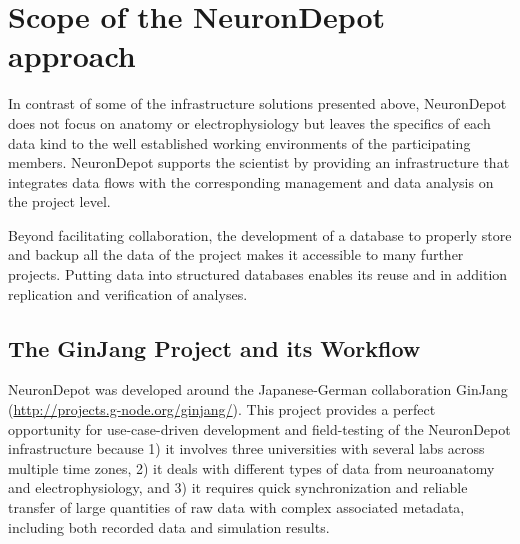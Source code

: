 \documentclass{frontiersSCNS} %
\begin{document}
\section{Scope of the NeuronDepot approach}

In contrast of some of the infrastructure solutions presented above,
NeuronDepot does
not focus on anatomy or electrophysiology but leaves the specifics of each data
kind to the well established working environments of the participating members.
NeuronDepot supports the scientist by providing an infrastructure that
integrates data flows with the corresponding management and data analysis on
the project level.

Beyond facilitating collaboration, the development of a database to properly
store and backup all the data of the project makes it accessible to many
further projects. Putting data into structured databases enables its reuse
and in addition replication and verification of analyses.

\subsection{The GinJang Project and its Workflow}

NeuronDepot was developed around the Japanese-German collaboration GinJang
(\url{http://projects.g-node.org/ginjang/}).
This project provides a perfect opportunity for use-case-driven development and
field-testing of the NeuronDepot infrastructure because 1) it involves three
universities with several labs across multiple time zones, 2) it deals with
different types of data from neuroanatomy and electrophysiology, and 3) it
requires quick synchronization and reliable transfer of large quantities of raw
data with complex associated metadata, including both recorded data and
simulation results.
\end{document}
